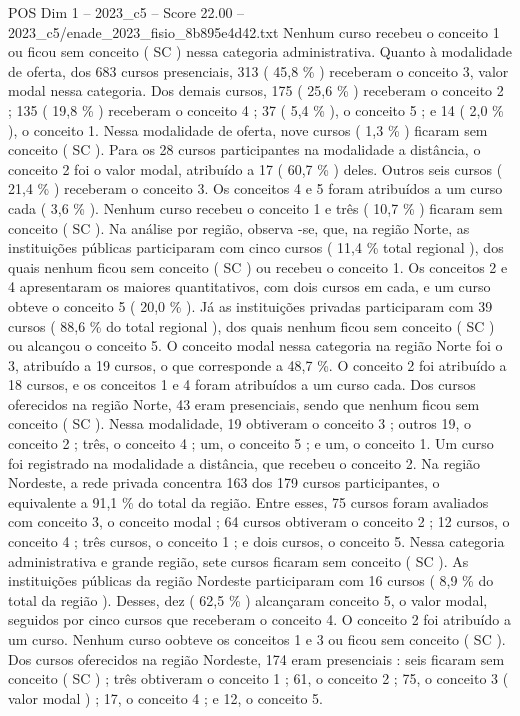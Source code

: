 \begin{textsample}{POS Dim 1 – 2023\_c5 – Score 22.00 – 2023\_c5/enade\_2023\_fisio\_8b895e4d42.txt}
Nenhum curso recebeu o conceito 1 ou ficou sem conceito ( SC ) nessa categoria administrativa.
Quanto à modalidade de oferta, dos 683 cursos presenciais, 313 ( 45,8 \% ) receberam o conceito 3, valor modal nessa categoria.
Dos demais cursos, 175 ( 25,6 \% ) receberam o conceito 2 ; 135 ( 19,8 \% ) receberam o conceito 4 ; 37 ( 5,4 \% ), o conceito 5 ; e 14 ( 2,0 \% ), o conceito 1.
Nessa modalidade de oferta, nove cursos ( 1,3 \% ) ficaram sem conceito ( SC ).
Para os 28 cursos participantes na modalidade a distância, o conceito 2 foi o valor modal, atribuído a 17 ( 60,7 \% ) deles.
Outros seis cursos ( 21,4 \% ) receberam o conceito 3.
Os conceitos 4 e 5 foram atribuídos a um curso cada ( 3,6 \% ).
Nenhum curso recebeu o conceito 1 e três ( 10,7 \% ) ficaram sem conceito ( SC ).
Na análise por região, observa -se, que, na região Norte, as instituições públicas participaram com cinco cursos ( 11,4 \% total regional ), dos quais nenhum ficou sem conceito ( SC ) ou recebeu o conceito 1.
Os conceitos 2 e 4 apresentaram os maiores quantitativos, com dois cursos em cada, e um curso obteve o conceito 5 ( 20,0 \% ).
Já as instituições privadas participaram com 39 cursos ( 88,6 \% do total regional ), dos quais nenhum ficou sem conceito ( SC ) ou alcançou o conceito 5.
O conceito modal nessa categoria na região Norte foi o 3, atribuído a 19 cursos, o que corresponde a 48,7 \%.
O conceito 2 foi atribuído a 18 cursos, e os conceitos 1 e 4 foram atribuídos a um curso cada.
Dos cursos oferecidos na região Norte, 43 eram presenciais, sendo que nenhum ficou sem conceito ( SC ).
Nessa modalidade, 19 obtiveram o conceito 3 ; outros 19, o conceito 2 ; três, o conceito 4 ; um, o conceito 5 ; e um, o conceito 1.
Um curso foi registrado na modalidade a distância, que recebeu o conceito 2.
Na região Nordeste, a rede privada concentra 163 dos 179 cursos participantes, o equivalente a 91,1 \% do total da região.
Entre esses, 75 cursos foram avaliados com conceito 3, o conceito modal ; 64 cursos obtiveram o conceito 2 ; 12 cursos, o conceito 4 ; três cursos, o conceito 1 ; e dois cursos, o conceito 5.
Nessa categoria administrativa e grande região, sete cursos ficaram sem conceito ( SC ).
As instituições públicas da região Nordeste participaram com 16 cursos ( 8,9 \% do total da região ).
Desses, dez ( 62,5 \% ) alcançaram conceito 5, o valor modal, seguidos por cinco cursos que receberam o conceito 4.
O conceito 2 foi atribuído a um curso.
Nenhum curso oobteve os conceitos 1 e 3 ou ficou sem conceito ( SC ).
Dos cursos oferecidos na região Nordeste, 174 eram presenciais : seis ficaram sem conceito ( SC ) ; três obtiveram o conceito 1 ; 61, o conceito 2 ; 75, o conceito 3 ( valor modal ) ; 17, o conceito 4 ; e 12, o conceito 5.

\end{textsample}
